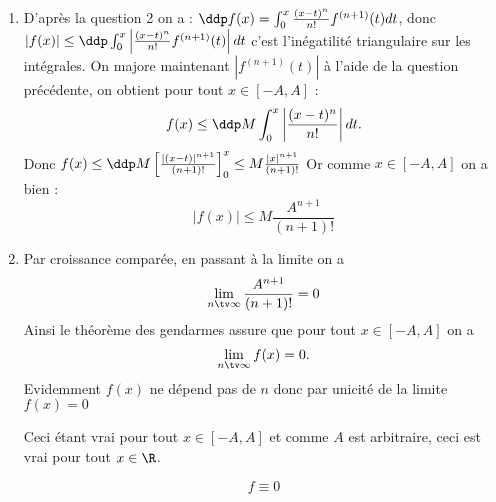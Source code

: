 \begin{correction}
\begin{enumerate}
\begin{enumerate}
\item  D'après la question 2 on a : 
$\ddp f(x) = \int_0^x \frac{(x-t)^n}{n!} f^{(n+1)} (t) dt$, donc $|f(x)| \leq\ddp   \int_0^x \left|  \frac{(x-t)^n}{n!} f^{(n+1)} (t) \right| dt$ c'est l'inégatilité triangulaire sur les intégrales. On majore maintenant $\left|  f^{(n+1)} (t) \right| $ à l'aide de la question précédente, on obtient pour tout $x\in [-A,A]$ :
$$f(x) \leq  \ddp M  \int_0^x \left|  \frac{(x-t)^n}{n!}  \right| dt.$$
Donc $f(x) \leq \ddp M \left[ \frac{|(x-t)|^{n+1}}{(n+1)!}\right]_0^x \leq M  \frac{|x|^{n+1}}{(n+1)!}$ Or comme $x\in [-A,A]$ on a bien : 
$$|f(x)|\leq M\frac{A^{n+1}}{(n+1)!}$$
\item Par croissance comparée, en passant à la limite on a $$\lim_{n\tv \infty} \frac{A^{n+1}}{(n+1)!} = 0$$
Ainsi le théorème des gendarmes assure que pour tout $x\in [-A,A]$ on a 
$$\lim_{n\tv \infty} f(x) = 0.$$ Evidemment $f(x) $ ne dépend pas de $n$ donc par unicité de la limite $f(x) = 0$

Ceci étant vrai pour tout $x \in [-A,A]$ et comme $A$ est arbitraire, ceci est vrai pour tout $x \in \R$. 

$$f\equiv 0$$

\end{enumerate}

\end{enumerate}

\end{correction}